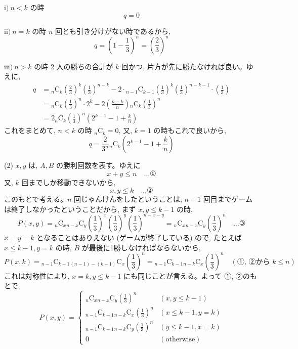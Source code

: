\documentclass[../main.tex]{subfiles}
\begin{document}
$\text{i)} \ n < k \text{ の時}$
\[
q = 0
\]

$\text{ii)} \ n = k \text{ の時}$
$n$ 回とも引き分けがない時であるから,
\[
q = \left(1 - \frac{1}{3}\right)^n = \left(\frac{2}{3}\right)^n
\]

$\text{iii)} \ n > k \text{ の時}$
2 人の勝ちの合計が $k$ 回かつ, 片方が先に勝たなければ良い。ゆえに,
\begin{align*}
q &= {}_n\text{C}_k \left(\frac{2}{3}\right)^k \left(\frac{1}{3}\right)^{n-k} - 2 \cdot {}_{n-1}\text{C}_{k-1} \left(\frac{1}{3}\right)^k \left(\frac{1}{3}\right)^{n-k-1} \cdot \left(\frac{1}{3}\right) \\
&= {}_n\text{C}_k \left(\frac{1}{3}\right)^n \cdot 2^k - 2 \left(\frac{n-k}{n}\right) {}_n\text{C}_k \left(\frac{1}{3}\right)^n \\
&= 2 {}_n\text{C}_k \left(\frac{1}{3}\right)^n \left( 2^{k-1} - 1 + \frac{k}{n} \right)
\end{align*}
これをまとめて, $n < k$ の時 ${}_n\text{C}_k = 0$, 又, $k=1$ の時もこれで良いから,
\[
q = \frac{2}{3^n} {}_n\text{C}_k \left( 2^{k-1} - 1 + \frac{k}{n} \right)
\]

(2) $x, y$ は, $A, B$ の勝利回数を表す。ゆえに
\[
x + y \le n \quad \dots \text{①}
\]
又, $k$ 回までしか移動できないから,
\[
x, y \le k \quad \dots \text{②}
\]
このもとで考える。$n$ 回じゃんけんをしたということは, $n-1$ 回目までゲームは終了しなかったということだから, まず $x, y \le k-1$ の時,
\[
P(x, y) = {}_n\text{C}_x {}_{n-x}\text{C}_y \left(\frac{1}{3}\right)^x \left(\frac{1}{3}\right)^y \left(\frac{1}{3}\right)^{n-x-y} = {}_n\text{C}_x {}_{n-x}\text{C}_y \left(\frac{1}{3}\right)^n \quad \dots \text{③}
\]
$x = y = k$ となることはありえない (ゲームが終了している) ので, たとえば $x \le k-1, y = k$ の時, $B$ が最後に1勝しなければならないから,
\[
P(x, k) = {}_{n-1}\text{C}_{k-1} {}_{(n-1)-(k-1)}\text{C}_x \left(\frac{1}{3}\right)^n = {}_{n-1}\text{C}_{k-1} {}_{n-k}\text{C}_x \left(\frac{1}{3}\right)^n \quad (\text{①, ②から } k \le n)
\]
これは対称性により, $x = k, y \le k-1$ にも同じことが言える。よって ①, ②のもとで,
\[
P(x, y) =
\begin{cases}
{}_n\text{C}_x {}_{n-x}\text{C}_y \left(\frac{1}{3}\right)^n & (x, y \le k-1) \\
{}_{n-1}\text{C}_{k-1} {}_{n-k}\text{C}_x \left(\frac{1}{3}\right)^n & (x \le k-1, y = k) \\
{}_{n-1}\text{C}_{k-1} {}_{n-k}\text{C}_y \left(\frac{1}{3}\right)^n & (y \le k-1, x = k) \\
0 & (\text{otherwise})
\end{cases}
\]
\end{document}
